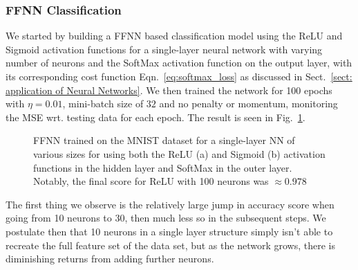 \documentclass[reprint, english, nofootinbib]{revtex4-2}
\begin{document}
\subsubsection{FFNN Classification}
\noindent
We started by building a FFNN based classification model using the ReLU and Sigmoid activation functions for a single-layer neural network with varying number of neurons and the SoftMax activation function on the output layer, with its corresponding cost function Eqn.~\ref{eq:softmax_loss} as discussed in Sect.~\ref{sect: application of Neural Networks}. We then trained the network for 100 epochs with $\eta = 0.01$, mini-batch size of $32$ and no penalty or momentum, monitoring the MSE wrt. testing data for each epoch. The result is seen in Fig.~\ref{fig: single layer MNIST relu and sigmoid}.
\begin{figure}[h!tb]
    \caption{\label{fig: single layer MNIST relu and sigmoid}FFNN trained on the MNIST dataset for a single-layer NN of various sizes for using both the ReLU (a) and Sigmoid (b) activation functions in the hidden layer and SoftMax in the outer layer. Notably, the final score for ReLU with 100 neurons was $\approx 0.978$}
\end{figure}
The first thing we observe is the relatively large jump in accuracy score when going from 10 neurons to 30, then much less so in the subsequent steps. We postulate then that 10 neurons in a single layer structure simply isn't able to recreate the full feature set of the data set, but as the network grows, there is diminishing returns from adding further neurons.
\end{document}
